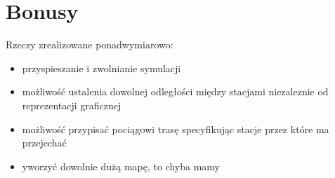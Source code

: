 \documentclass[a4paper, 11pt]{beamer}
\begin{document}
\section{Bonusy}
\begin{frame}
Rzeczy zrealizowane ponadwymiarowo:
\begin{itemize}
\item przyspieszanie i zwolnianie symulacji
\item możliwość ustalenia dowolnej odległości między stacjami niezaleznie od reprezentacji graficznej
\item możliwość przypisać pociągowi trasę specyfikując stacje przez które ma przejechać
\item yworzyć dowolnie dużą mapę, to chyba mamy
\end{itemize}
\end{frame}
\end{document}
